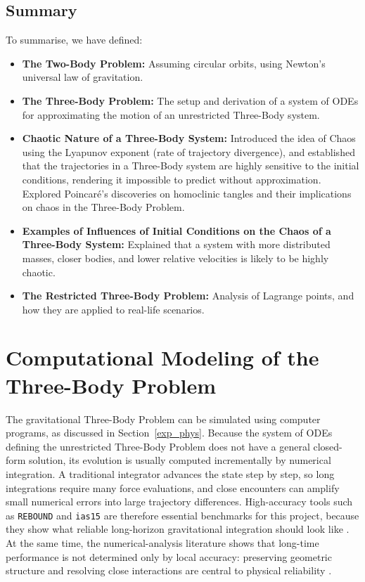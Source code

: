 \documentclass[12pt]{article}
\begin{document}
\subsection{Summary}

To summarise, we have defined:

\begin{itemize}
    \item \textbf{The Two-Body Problem:} Assuming circular orbits, using Newton's universal law of gravitation.
    \item \textbf{The Three-Body Problem:} The setup and derivation of a system of ODEs for approximating the motion of an unrestricted Three-Body system.
    \item \textbf{Chaotic Nature of a Three-Body System:} Introduced the idea of Chaos using the Lyapunov exponent (rate of trajectory divergence), and established that the trajectories in a Three-Body system are highly sensitive to the initial conditions, rendering it impossible to predict without approximation. Explored Poincaré's discoveries on homoclinic tangles and their implications on chaos in the Three-Body Problem.
    \item \textbf{Examples of Influences of Initial Conditions on the Chaos of a Three-Body System:} Explained that a system with more distributed masses, closer bodies, and lower relative velocities is likely to be highly chaotic.
    \item \textbf{The Restricted Three-Body Problem:} Analysis of Lagrange points, and how they are applied to real-life scenarios.
\end{itemize}

\section{Computational Modeling of the Three-Body Problem}
\label{sec:comp_modeling}

The gravitational Three-Body Problem can be simulated using computer programs, as discussed in Section~\ref{exp_phys}. Because the system of ODEs defining the unrestricted Three-Body Problem does not have a general closed-form solution, its evolution is usually computed incrementally by numerical integration. A traditional integrator advances the state step by step, so long integrations require many force evaluations, and close encounters can amplify small numerical errors into large trajectory differences. High-accuracy tools such as \texttt{REBOUND} and \texttt{ias15} are therefore essential benchmarks for this project, because they show what reliable long-horizon gravitational integration should look like \cite{Rein2012,Rein_2014}. At the same time, the numerical-analysis literature shows that long-time performance is not determined only by local accuracy: preserving geometric structure and resolving close interactions are central to physical reliability \cite{hairer2006geometric,boekholt2015reliability}.
\end{document}
